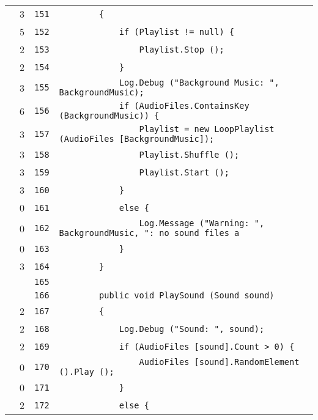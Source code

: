 \documentclass[a4paper,10pt]{article}
\begin{document}
\begin{longtable}[l]{lrrl}
\cellcolor{green} & 3 & \verb~151~ & \verb~        {~\\
\cellcolor{green} & 5 & \verb~152~ & \verb~            if (Playlist != null) {~\\
\cellcolor{green} & 2 & \verb~153~ & \verb~                Playlist.Stop ();~\\
\cellcolor{green} & 2 & \verb~154~ & \verb~            }~\\
\cellcolor{green} & 3 & \verb~155~ & \verb~            Log.Debug ("Background Music: ", BackgroundMusic);~\\
\cellcolor{green} & 6 & \verb~156~ & \verb~            if (AudioFiles.ContainsKey (BackgroundMusic)) {~\\
\cellcolor{green} & 3 & \verb~157~ & \verb~                Playlist = new LoopPlaylist (AudioFiles [BackgroundMusic]);~\\
\cellcolor{green} & 3 & \verb~158~ & \verb~                Playlist.Shuffle ();~\\
\cellcolor{green} & 3 & \verb~159~ & \verb~                Playlist.Start ();~\\
\cellcolor{green} & 3 & \verb~160~ & \verb~            }~\\
\cellcolor{red} & 0 & \verb~161~ & \verb~            else {~\\
\cellcolor{red} & 0 & \verb~162~ & \verb~                Log.Message ("Warning: ", BackgroundMusic, ": no sound files a~\\
\cellcolor{red} & 0 & \verb~163~ & \verb~            }~\\
\cellcolor{green} & 3 & \verb~164~ & \verb~        }~\\
\cellcolor{gray} &  & \verb~165~ & \verb~~\\
\cellcolor{gray} &  & \verb~166~ & \verb~        public void PlaySound (Sound sound)~\\
\cellcolor{green} & 2 & \verb~167~ & \verb~        {~\\
\cellcolor{green} & 2 & \verb~168~ & \verb~            Log.Debug ("Sound: ", sound);~\\
\cellcolor{green} & 2 & \verb~169~ & \verb~            if (AudioFiles [sound].Count > 0) {~\\
\cellcolor{red} & 0 & \verb~170~ & \verb~                AudioFiles [sound].RandomElement ().Play ();~\\
\cellcolor{red} & 0 & \verb~171~ & \verb~            }~\\
\cellcolor{green} & 2 & \verb~172~ & \verb~            else {~\\

\end{longtable}
\end{document}

